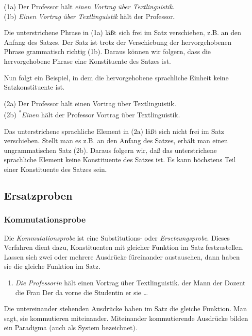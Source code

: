 \documentclass[
  letterpaper,
  DIV=11,
  numbers=noendperiod]{scrreprt}
\providecommand{\tightlist}{%
  \setlength{\itemsep}{0pt}\setlength{\parskip}{0pt}}\usepackage{longtable,booktabs,array}
\begin{document}
(1a) Der Professor hält \emph{einen Vortrag über Textlinguistik}.\\
(1b) \emph{Einen Vortrag über Textlinguistik} hält der Professor.

Die unterstrichene Phrase in (1a) läßt sich frei im Satz verschieben,
z.B. an den Anfang des Satzes. Der Satz ist trotz der Verschiebung der
hervorgehobenen Phrase grammatisch richtig (1b). Daraus können wir
folgern, dass die hervorgehobene Phrase eine Konstituente des Satzes
ist.

Nun folgt ein Beispiel, in dem die hervorgehobene sprachliche Einheit
keine Satzkonstituente ist.

(2a) Der Professor hält einen Vortrag über Textlinguistik.\\
(2b) \textsuperscript{*}\emph{Einen} hält der Professor Vortrag über
Textlinguistik.

Das unterstrichene sprachliche Element in (2a) läßt sich nicht frei im
Satz verschieben. Stellt man es z.B. an den Anfang des Satzes, erhält
man einen ungrammatischen Satz (2b). Daraus folgern wir, daß das
unterstrichene sprachliche Element keine Konstituente des Satzes ist. Es
kann höchstens Teil einer Konstituente des Satzes sein.

\hypertarget{ersatzproben}{%
\subsection{Ersatzproben}\label{ersatzproben}}

\hypertarget{kommutationsprobe}{%
\subsubsection{Kommutationsprobe}\label{kommutationsprobe}}

Die \emph{Kommutationsprobe} ist eine Substitutions- oder
\emph{Ersetzungsprobe}. Dieses Verfahren dient dazu, Konstituenten mit
gleicher Funktion im Satz festzustellen. Lassen sich zwei oder mehrere
Ausdrücke füreinander austauschen, dann haben sie die gleiche Funktion
im Satz.

\begin{enumerate}
\def\labelenumi{(\arabic{enumi})}
\setcounter{enumi}{2}
\tightlist
\item
  \emph{Die Professorin} hält einen Vortrag über Textlinguistik. der
  Mann der Dozent die Frau Der da vorne die Studentin er sie \ldots{}
\end{enumerate}

Die untereinander stehenden Ausdrücke haben im Satz die gleiche
Funktion. Man sagt, sie kommutieren miteinander. Miteinander
kommutierende Ausdrücke bilden ein Paradigma (auch als System
bezeichnet).
\end{document}
